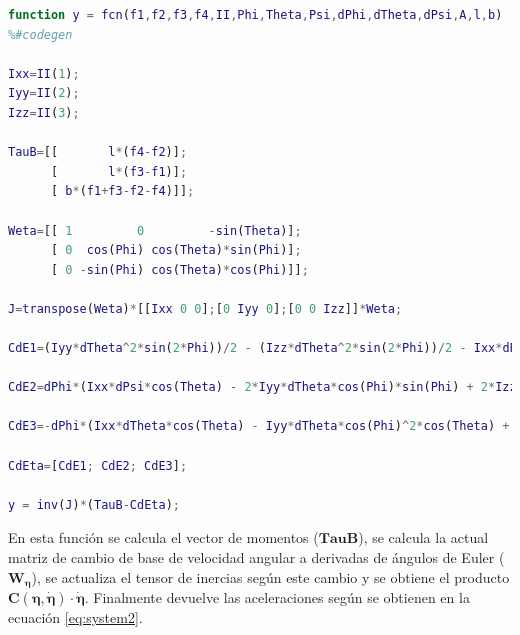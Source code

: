 \documentclass[twoside,11pt]{book}
\begin{document}
\singlespacing
\begin{lstlisting}[language=Matlab]
function y = fcn(f1,f2,f3,f4,II,Phi,Theta,Psi,dPhi,dTheta,dPsi,A,l,b)
%#codegen

Ixx=II(1);
Iyy=II(2);
Izz=II(3);
 
TauB=[[       l*(f4-f2)];
      [       l*(f3-f1)];
      [ b*(f1+f3-f2-f4)]];  

Weta=[[ 1         0         -sin(Theta)];
      [ 0  cos(Phi) cos(Theta)*sin(Phi)];
      [ 0 -sin(Phi) cos(Theta)*cos(Phi)]];
 
J=transpose(Weta)*[[Ixx 0 0];[0 Iyy 0];[0 0 Izz]]*Weta;  

CdE1=(Iyy*dTheta^2*sin(2*Phi))/2 - (Izz*dTheta^2*sin(2*Phi))/2 - Ixx*dPsi*dTheta*cos(Theta) - (Iyy*dPsi^2*sin(2*Phi)*cos(Theta)^2)/2 + (Izz*dPsi^2*sin(2*Phi)*cos(Theta)^2)/2 - Iyy*dPsi*dTheta*cos(2*Phi)*cos(Theta) + Izz*dPsi*dTheta*cos(2*Phi)*cos(Theta);

CdE2=dPhi*(Ixx*dPsi*cos(Theta) - 2*Iyy*dTheta*cos(Phi)*sin(Phi) + 2*Izz*dTheta*cos(Phi)*sin(Phi) + Iyy*dPsi*cos(Phi)^2*cos(Theta) - Izz*dPsi*cos(Phi)^2*cos(Theta) - Iyy*dPsi*cos(Theta)*sin(Phi)^2 + Izz*dPsi*cos(Theta)*sin(Phi)^2)  - Ixx*dPsi^2*cos(Theta)*sin(Theta) + Iyy*dPsi^2*cos(Theta)*sin(Phi)^2*sin(Theta)  + Izz*dPsi^2*cos(Phi)^2*cos(Theta)*sin(Theta);

CdE3=-dPhi*(Ixx*dTheta*cos(Theta) - Iyy*dTheta*cos(Phi)^2*cos(Theta) + Izz*dTheta*cos(Phi)^2*cos(Theta) + Iyy*dTheta*cos(Theta)*sin(Phi)^2 - Izz*dTheta*cos(Theta)*sin(Phi)^2 - 2*Iyy*dPsi*cos(Phi)*cos(Theta)^2*sin(Phi) + 2*Izz*dPsi*cos(Phi)*cos(Theta)^2*sin(Phi))  - Iyy*dTheta^2*cos(Phi)*sin(Phi)*sin(Theta) + Izz*dTheta^2*cos(Phi)*sin(Phi)*sin(Theta) + 2*Ixx*dPsi*dTheta*cos(Theta)*sin(Theta) - 2*Izz*dPsi*dTheta*cos(Phi)^2*cos(Theta)*sin(Theta) - 2*Iyy*dPsi*dTheta*cos(Theta)*sin(Phi)^2*sin(Theta);

CdEta=[CdE1; CdE2; CdE3];

y = inv(J)*(TauB-CdEta);
\end{lstlisting}
\onehalfspacing

En esta función se calcula el vector de momentos ($\mathbf{TauB}$), se calcula la actual matriz de cambio de base de velocidad angular a derivadas de ángulos de Euler ($\mathbf{W_\eta}$), se actualiza el tensor de inercias según este cambio y se obtiene el producto $\pmb{C(\eta,\dot{\eta})}\cdot\pmb{\dot{\eta}}$. Finalmente devuelve las aceleraciones según se obtienen en la ecuación \ref{eq:system2}.
\end{document}
